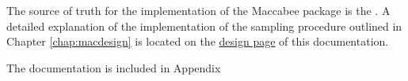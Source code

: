 \documentclass[../main.tex]{subfiles}
\begin{document}
The source of truth for the implementation of the Maccabee package is the . A detailed explanation of the implementation of the sampling procedure outlined in Chapter \ref{chap:macdesign} is located on the \href{\RTDurl/en/latest/design.html}{design page} of this documentation.

\vspace{\baselineskip}

The documentation is included in Appendix
\end{document}
